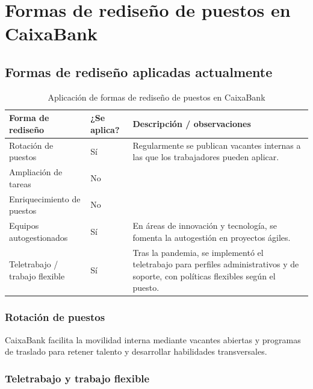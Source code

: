 \section{Formas de rediseño de puestos en CaixaBank}

\subsection{Formas de rediseño aplicadas actualmente}

\begin{table}[H]
  \centering
  \small
  \caption{Aplicación de formas de rediseño de puestos en CaixaBank}
  \begin{tabularx}{\textwidth}{p{} p{} X}
    \toprule
    \textbf{Forma de rediseño} & \textbf{¿Se aplica?} & \textbf{Descripción / observaciones} \\
    \midrule
    Rotación de puestos & Sí & Regularmente se publican vacantes internas a las que los trabajadores pueden aplicar. \\ \addlinespace
    Ampliación de tareas & No & \\ \addlinespace
    Enriquecimiento de puestos & No & \\ \addlinespace
    Equipos autogestionados & Sí & En áreas de innovación y tecnología, se fomenta la autogestión en proyectos ágiles. \\ \addlinespace
    Teletrabajo / trabajo flexible & Sí & Tras la pandemia, se implementó el teletrabajo para perfiles administrativos y de soporte, con políticas flexibles según el puesto. \\
    \bottomrule
  \end{tabularx}
\end{table}

\subsubsection{Rotación de puestos}

CaixaBank facilita la movilidad interna mediante vacantes abiertas y programas de traslado para retener talento y desarrollar habilidades transversales.

\subsubsection{Teletrabajo y trabajo flexible}

